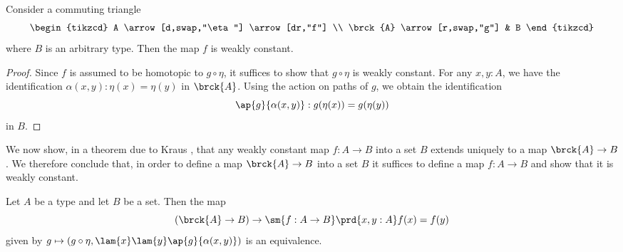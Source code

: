\begin{lem}
  Consider a commuting triangle
  \begin{equation*}
    \begin{tikzcd}
      A \arrow[d,swap,"\eta"] \arrow[dr,"f"] \\
      \brck{A} \arrow[r,swap,"g"] & B      
    \end{tikzcd}
  \end{equation*}
  where $B$ is an arbitrary type. Then the map $f$ is weakly constant.
\end{lem}

\begin{proof}
  Since $f$ is assumed to be homotopic to $g\circ \eta$, it suffices to show that $g\circ\eta$ is weakly constant. For any $x,y:A$, we have the identification $\alpha(x,y):\eta(x)=\eta(y)$ in $\brck{A}$. Using the action on paths of $g$, we obtain the identification
  \begin{equation*}
    \ap{g}{\alpha(x,y)}:g(\eta(x))=g(\eta(y))
  \end{equation*}
  in $B$.
\end{proof}

We now show, in a theorem due to Kraus \cite{Kraus}, that any weakly constant map $f:A\to B$ into a set $B$ extends uniquely to a map $\brck{A}\to B$. We therefore conclude that, in order to define a map $\brck{A}\to B$ into a set $B$ it suffices to define a map $f:A\to B$ and show that it is weakly constant.

\begin{thm}[Kraus]\label{ex:weakly-constant-map}
  Let $A$ be a type and let $B$ be a set. Then the map
  \begin{equation*}
    (\brck{A}\to B)\to \sm{f:A\to B}\prd{x,y:A}f(x)=f(y)
  \end{equation*}
  given by $g\mapsto (g\circ\eta,\lam{x}\lam{y}\ap{g}{\alpha(x,y)})$ is an equivalence.
\end{thm}

